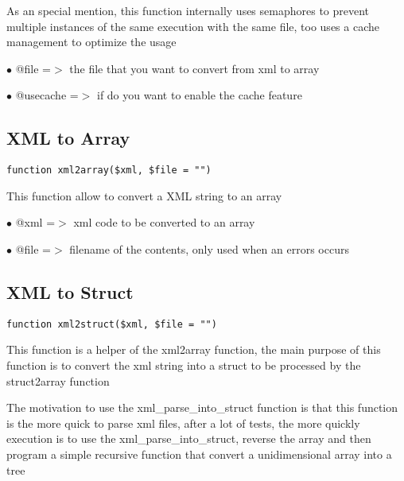 \documentclass[a4paper]{book}
\begin{document}
As an special mention, this function internally uses semaphores to prevent
multiple instances of the same execution with the same file, too uses a cache
management to optimize the usage

\begin{compactitem}
\item[\color{myblue}$\bullet$] @file     =$>$ the file that you want to convert from xml to array
\item[\color{myblue}$\bullet$] @usecache =$>$ if do you want to enable the cache feature
\end{compactitem}

\hypertarget{toc323}{}
\subsection{XML to Array}

\begin{lstlisting}
function xml2array($xml, $file = "")
\end{lstlisting}

This function allow to convert a XML string to an array

\begin{compactitem}
\item[\color{myblue}$\bullet$] @xml  =$>$ xml code to be converted to an array
\item[\color{myblue}$\bullet$] @file =$>$ filename of the contents, only used when an errors occurs
\end{compactitem}

\hypertarget{toc324}{}
\subsection{XML to Struct}

\begin{lstlisting}
function xml2struct($xml, $file = "")
\end{lstlisting}

This function is a helper of the xml2array function, the main purpose of this
function is to convert the xml string into a struct to be processed by the
struct2array function

The motivation to use the xml\_parse\_into\_struct function is that this function
is the more quick to parse xml files, after a lot of tests, the more quickly
execution is to use the xml\_parse\_into\_struct, reverse the array and then
program a simple recursive function that convert a unidimensional array into
a tree
\end{document}
